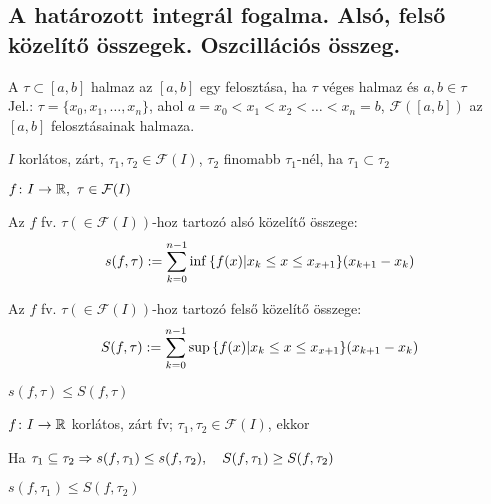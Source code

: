 \subsection{A határozott integrál fogalma. Alsó, felső közelítő összegek. Oszcillációs összeg.}
\begin{de}
  A $\tau\subset[a,b]$ halmaz az $[a,b]$ egy felosztása, ha $\tau$ véges halmaz és $a,b\in\tau$\\
  Jel.: $\tau=\{x_0,x_1,\ldots,x_n\}$, ahol $a=x_0<x_1<x_2<\ldots<x_n=b$, $\mathcal{F}([a,b])$ az $[a,b]$ felosztásainak halmaza.
\end{de}
\begin{de}
  $I$ korlátos, zárt, $\tau_1,\tau_2\in\mathcal{F}(I)$, $\tau_2$ finomabb $\tau_1$-nél, ha $\tau_1\subset\tau_2$\\
\end{de}
\begin{de}
  $f\colon I\to\R,\ \tau\in{\mathcal{F}(I)}$\\
  \begin{enumzjr}
  \item  Az $f$ fv. $\tau(\in{\mathcal{F}(I)})$-hoz tartozó alsó közelítő összege:
  \[s(f,\tau):=\displaystyle\sum_{k=0}^{n-1}{\inf{\{f(x)|x_k\le{x}\le{x_{x+1}}\}}(x_{k+1}-x_k)}\]
  \item  Az $f$ fv. $\tau(\in{\mathcal{F}(I)})$-hoz tartozó felső közelítő összege:
    \[S(f,\tau):=\displaystyle\sum_{k=0}^{n-1}{\sup{\{f(x)|x_k\le{x}\le{x_{x+1}}\}}(x_{k+1}-x_k)}\]
  \end{enumzjr}
\end{de}
\begin{megj}
    $s(f,\tau)\le S(f,\tau)$
\end{megj}
\begin{te}
  $f\colon I\rightarrow\mathbb{R}$ korlátos, zárt fv; $\tau_1,\tau_2\in \mathcal{F}(I)$, ekkor\\
  \begin{enumzjr}
  \item Ha $\tau_1\subseteq\tau_2\Rightarrow{s(f,\tau_1)}\le{s(f,\tau_2)},\quad{S(f,\tau_1)}\ge{S(f,\tau_2)}$\\
  \item $s(f,\tau_1)\le{S(f,\tau_2)}$
  \end{enumzjr}
\end{te}

